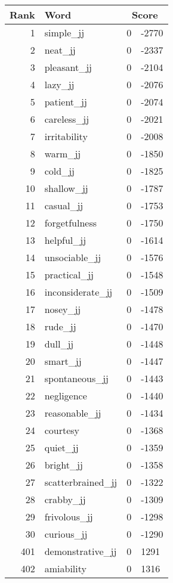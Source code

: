 \begin{longtable}[!htbp]{| rlr@{.}l |}
    \hline
    \textbf{Rank} & \textbf{Word} & \multicolumn{2}{c|}{\textbf{Score}} \\
    \hline
    \endhead
    1 & simple\_jj & 0 & -2770 \\
    2 & neat\_jj & 0 & -2337 \\
    3 & pleasant\_jj & 0 & -2104 \\
    4 & lazy\_jj & 0 & -2076 \\
    5 & patient\_jj & 0 & -2074 \\
    6 & careless\_jj & 0 & -2021 \\
    7 & irritability & 0 & -2008 \\
    8 & warm\_jj & 0 & -1850 \\
    9 & cold\_jj & 0 & -1825 \\
    10 & shallow\_jj & 0 & -1787 \\
    11 & casual\_jj & 0 & -1753 \\
    12 & forgetfulness & 0 & -1750 \\
    13 & helpful\_jj & 0 & -1614 \\
    14 & unsociable\_jj & 0 & -1576 \\
    15 & practical\_jj & 0 & -1548 \\
    16 & inconsiderate\_jj & 0 & -1509 \\
    17 & nosey\_jj & 0 & -1478 \\
    18 & rude\_jj & 0 & -1470 \\
    19 & dull\_jj & 0 & -1448 \\
    20 & smart\_jj & 0 & -1447 \\
    21 & spontaneous\_jj & 0 & -1443 \\
    22 & negligence & 0 & -1440 \\
    23 & reasonable\_jj & 0 & -1434 \\
    24 & courtesy & 0 & -1368 \\
    25 & quiet\_jj & 0 & -1359 \\
    26 & bright\_jj & 0 & -1358 \\
    27 & scatterbrained\_jj & 0 & -1322 \\
    28 & crabby\_jj & 0 & -1309 \\
    29 & frivolous\_jj & 0 & -1298 \\
    30 & curious\_jj & 0 & -1290 \\
    401 & demonstrative\_jj & 0 & 1291 \\
    402 & amiability & 0 & 1316 \\

\end{longtable}
